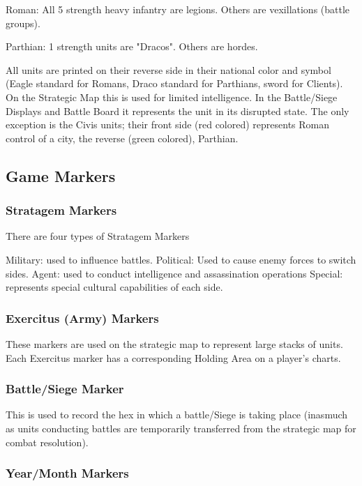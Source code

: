 Roman: All 5 strength heavy infantry are legions. Others are vexillations (battle groups).

Parthian: 1 strength units are "Dracos". Others are hordes.

All units are printed on their reverse side in their national color and symbol (Eagle standard for Romans, Draco standard for Parthians, sword for Clients). On the Strategic Map this is used for limited intelligence. In the Battle/Siege Displays and Battle Board it represents the unit in its disrupted state. The only exception is the Civis units; their front side (red colored) represents Roman control of a city, the reverse (green colored), Parthian.

\subsection{Game Markers}

\subsubsection{Stratagem Markers}

There are four types of Stratagem Markers

Military: used to influence battles.
Political: Used to cause enemy forces to switch sides.
Agent: used to conduct intelligence and assassination operations
Special: represents special cultural capabilities of each side.

\subsubsection{Exercitus (Army) Markers}

These markers are used on the strategic map to represent large stacks of units. Each Exercitus marker has a corresponding Holding Area on a player's charts.

\subsubsection{Battle/Siege Marker}

This is used to record the hex in which a battle/Siege is taking place (inasmuch as units conducting battles are temporarily transferred from the strategic map for combat resolution).

\subsubsection{Year/Month Markers}

